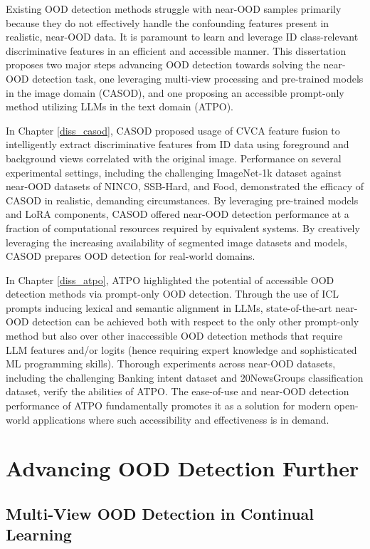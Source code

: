 Existing OOD detection methods struggle with near-OOD samples primarily because they do not effectively handle the confounding features present in realistic, near-OOD data. It is paramount to learn and leverage ID class-relevant discriminative features in an efficient and accessible manner. This dissertation proposes two major steps advancing OOD detection towards solving the near-OOD detection task, one leveraging multi-view processing and pre-trained models in the image domain (CASOD), and one proposing an accessible prompt-only method utilizing LLMs in the text domain (ATPO).

In Chapter \ref{diss_casod}, CASOD proposed usage of CVCA feature fusion to intelligently extract discriminative features from ID data using foreground and background views correlated with the original image. Performance on several experimental settings, including the challenging ImageNet-1k dataset against near-OOD datasets of NINCO, SSB-Hard, and Food, demonstrated the efficacy of CASOD in realistic, demanding circumstances. By leveraging pre-trained models and LoRA components, CASOD offered near-OOD detection performance at a fraction of computational resources required by equivalent systems. By creatively leveraging the increasing availability of segmented image datasets and models, CASOD prepares OOD detection for real-world domains.

In Chapter \ref{diss_atpo}, ATPO highlighted the potential of accessible OOD detection methods via prompt-only OOD detection. Through the use of ICL prompts inducing lexical and semantic alignment in LLMs, state-of-the-art near-OOD detection can be achieved both with respect to the only other prompt-only method but also over other inaccessible OOD detection methods that require LLM features and/or logits (hence requiring expert knowledge and sophisticated ML programming skills). Thorough experiments across near-OOD datasets, including the challenging Banking intent dataset and 20NewsGroups classification dataset, verify the abilities of ATPO. The ease-of-use and near-OOD detection performance of ATPO fundamentally promotes it as a solution for modern open-world applications where such accessibility and effectiveness is in demand.

\section{Advancing OOD Detection Further}
\label{sec:futwork}

\subsection{Multi-View OOD Detection in Continual Learning}
\label{sec:future_work-mvoodcl}

